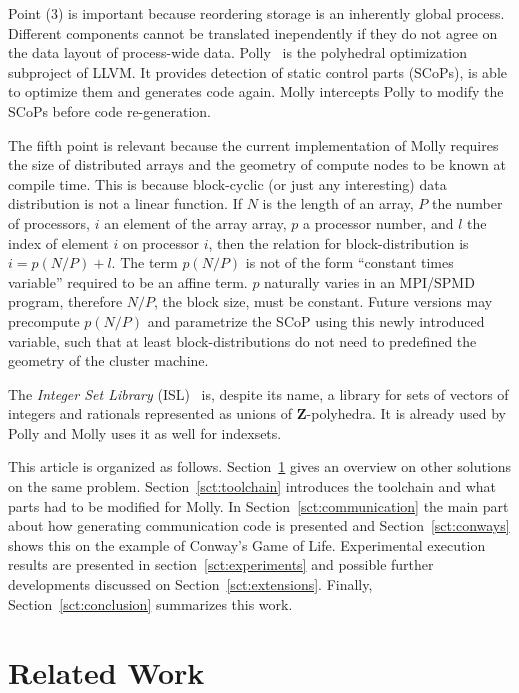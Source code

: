 \documentclass{sigplanconf}
\newcommand{\dquote}[1]{``#1''}
\begin{document}
Point (3) is important because reordering storage is an inherently global process. Different components cannot be translated inependently if they do not agree on the data layout of process-wide data. Polly~\cite{polly} is the polyhedral optimization subproject of LLVM. It provides detection of static control parts (SCoPs), is able to optimize them and generates code again. Molly intercepts Polly to modify the SCoPs before code re-generation.

The fifth point is relevant because the current implementation of Molly requires the size of distributed arrays and the geometry of compute nodes to be known at compile time. This is because block-cyclic (or just any interesting) data distribution is not a linear function. If $N$ is the length of an array, $P$ the number of processors, $i$ an element of the array array, $p$ a processor number, and $l$ the index of element $i$ on processor $i$, then the relation for block-distribution is $i = p(N/P) + l$. The term $p(N/P)$ is not of the form \dquote{constant times variable} required to be an affine term. $p$ naturally varies in an MPI/SPMD program, therefore $N/P$, the block size, must be constant. Future versions may precompute $p(N/P)$ and parametrize the SCoP using this newly introduced variable, such that at least block-distributions do not need to predefined the geometry of the cluster machine.

The \emph{Integer Set Library} (ISL)~\cite{isl} is, despite its name, a library for sets of vectors of integers and rationals represented as unions of $\mathbf{Z}$-polyhedra. It is already used by Polly and Molly uses it as well for indexsets.

This article is organized as follows. Section~\ref{sct:related} gives an overview on other solutions on the same problem. Section~\ref{sct:toolchain} introduces the toolchain and what parts had to be modified for Molly. In Section~\ref{sct:communication} the main part about how generating communication code is presented and Section~\ref{sct:conways} shows this on the example of Conway's Game of Life. Experimental execution results are presented in section~\ref{sct:experiments} and possible further developments discussed on Section~\ref{sct:extensions}. Finally, Section~\ref{sct:conclusion} summarizes this work.
 

\section{Related Work}\label{sct:related}
\end{document}
